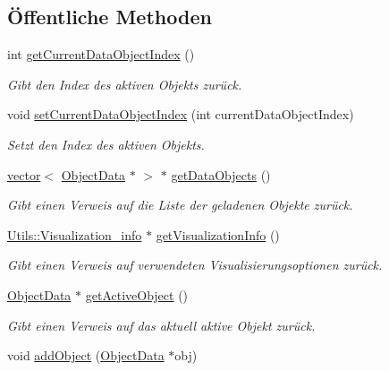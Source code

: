 \subsection*{Öffentliche Methoden}
\begin{DoxyCompactItemize}
\item 
int \hyperlink{classSimpleAnalyzerApp_ad759c546dadd12d8072f373c48a0e230}{get\-Current\-Data\-Object\-Index} ()
\begin{DoxyCompactList}\small\item\em Gibt den Index des aktiven Objekts zurück. \end{DoxyCompactList}\item 
void \hyperlink{classSimpleAnalyzerApp_a613955c888ef6b8f014504986951e2b9}{set\-Current\-Data\-Object\-Index} (int current\-Data\-Object\-Index)
\begin{DoxyCompactList}\small\item\em Setzt den Index des aktiven Objekts. \end{DoxyCompactList}\item 
\hyperlink{classstd_1_1vector}{vector}$<$ \hyperlink{classObjectData}{Object\-Data} $\ast$ $>$ $\ast$ \hyperlink{classSimpleAnalyzerApp_a977aa8cde1479c495e01caf25b6e8a1c}{get\-Data\-Objects} ()
\begin{DoxyCompactList}\small\item\em Gibt einen Verweis auf die Liste der geladenen Objekte zurück. \end{DoxyCompactList}\item 
\hyperlink{structUtils_1_1Visualization__info}{Utils\-::\-Visualization\-\_\-info} $\ast$ \hyperlink{classSimpleAnalyzerApp_aa0149bf3fcedd1ff880817a16e1e1574}{get\-Visualization\-Info} ()
\begin{DoxyCompactList}\small\item\em Gibt einen Verweis auf verwendeten Visualisierungsoptionen zurück. \end{DoxyCompactList}\item 
\hyperlink{classObjectData}{Object\-Data} $\ast$ \hyperlink{classSimpleAnalyzerApp_a9bf75442c8ccb79cc735cf922de83bdc}{get\-Active\-Object} ()
\begin{DoxyCompactList}\small\item\em Gibt einen Verweis auf das aktuell aktive Objekt zurück. \end{DoxyCompactList}\item 
void \hyperlink{classSimpleAnalyzerApp_acedd76089853323687a3ac9cfeed1540}{add\-Object} (\hyperlink{classObjectData}{Object\-Data} $\ast$obj)

\end{DoxyCompactItemize}

